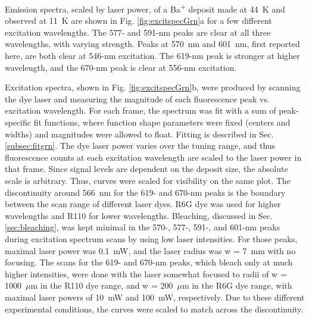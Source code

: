 



Emission spectra, scaled by laser power, of a Ba\textsuperscript{+} deposit made at 44~K and observed at 11~K are shown in Fig. \ref{fig:excitspecGrn}a for a few different excitation wavelengths.  The 577- and 591-nm peaks are clear at all three wavelengths, with varying strength.  Peaks at 570~nm and 601~nm, first reported here, are both clear at 546-nm excitation.  The 619-nm peak is stronger at higher wavelength, and the 670-nm peak is clear at 556-nm excitation.

Excitation spectra, shown in Fig. \ref{fig:excitspecGrn}b, were produced by scanning the dye laser and measuring the magnitude of each fluorescence peak vs. excitation wavelength.  For each frame, the spectrum was fit with a sum of peak-specific fit functions, where function shape parameters were fixed (centers and widths) and magnitudes were allowed to float.  Fitting is described in Sec. \ref{subsec:fitgrn}.  The dye laser power varies over the tuning range, and thus fluorescence counts at each excitation wavelength are scaled to the laser power in that frame.  Since signal levels are dependent on the deposit size, the absolute scale is arbitrary.  Thus, curves were scaled for visibility on the same plot.  The discontinuity around 566~nm for the 619- and 670-nm peaks is the boundary between the scan range of different laser dyes.  R6G dye was used for higher wavelengths and R110 for lower wavelengths.  Bleaching, discussed in Sec. \ref{sec:bleaching}, was kept minimal in the 570-, 577-, 591-, and 601-nm peaks during excitation spectrum scans by using low laser intensities.  For those peaks, maximal laser power was 0.1~mW, and the laser radius was w = 7~mm with no focusing.  The scans for the 619- and 670-nm peaks, which bleach only at much higher intensities, were done with the laser somewhat focused to radii of w = 1000~$\mu$m in the R110 dye range, and w = 200~$\mu$m in the R6G dye range, with maximal laser powers of 10~mW and 100~mW, respectively.  Due to these different experimental conditions, the curves were scaled to match across the discontinuity.

